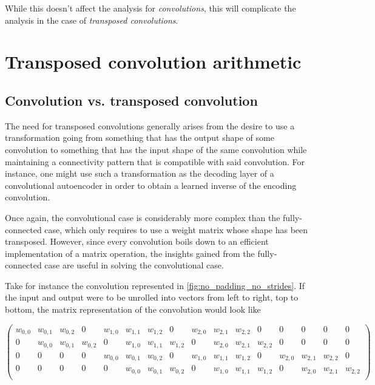 \documentclass{article}
\begin{document}
While this doesn't affect the analysis for {\em convolutions}, this will
complicate the analysis in the case of {\em transposed convolutions}.

\newpage
\section{Transposed convolution arithmetic}

\subsection{Convolution vs. transposed convolution}

The need for transposed convolutions generally arises from the desire to use a
transformation going from something that has the output shape of some
convolution to something that has the input shape of the same convolution while
maintaining a connectivity pattern that is compatible with said convolution.
For instance, one might use such a transformation as the decoding layer of a
convolutional autoencoder in order to obtain a learned inverse of the encoding
convolution.

Once again, the convolutional case is considerably more complex than the
fully-connected case, which only requires to use a weight matrix whose shape has
been transposed. However, since every convolution boils down to an efficient
implementation of a matrix operation, the insights gained from the
fully-connected case are useful in solving the convolutional case.

Take for instance the convolution represented in
\autoref{fig:no_padding_no_strides}. If the input and output were to be unrolled
into vectors from left to right, top to bottom, the matrix representation of the
convolution would look like

\begin{equation*}
    \begin{pmatrix}
    w_{0,0} & w_{0,1} & w_{0,2} & 0       & w_{1,0} & w_{1,1} & w_{1,2} & 0       &
    w_{2,0} & w_{2,1} & w_{2,2} & 0       & 0       & 0       & 0       & 0       \\
    0       & w_{0,0} & w_{0,1} & w_{0,2} & 0       & w_{1,0} & w_{1,1} & w_{1,2} &
    0       & w_{2,0} & w_{2,1} & w_{2,2} & 0       & 0       & 0       & 0       \\
    0       & 0       & 0       & 0       & w_{0,0} & w_{0,1} & w_{0,2} & 0       &
    w_{1,0} & w_{1,1} & w_{1,2} & 0       & w_{2,0} & w_{2,1} & w_{2,2} & 0       \\
    0       & 0       & 0       & 0       & 0       & w_{0,0} & w_{0,1} & w_{0,2} &
    0       & w_{1,0} & w_{1,1} & w_{1,2} & 0       & w_{2,0} & w_{2,1} & w_{2,2} \\
    \end{pmatrix}
\end{equation*}
\end{document}
